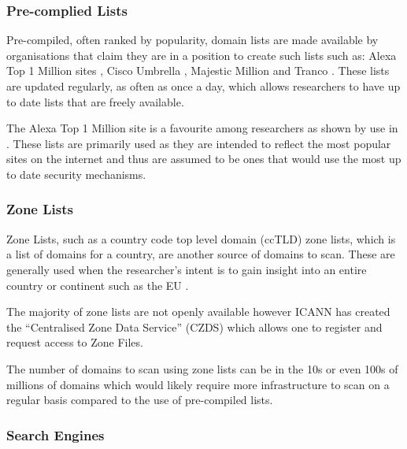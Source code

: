 \documentclass{mscreport}
\begin{document}
\subsubsection{Pre-complied Lists}

Pre-compiled, often ranked by popularity, domain lists are made available by organisations that claim they are in a position to create such lists such as: Alexa Top 1 Million sites \cite{noauthor_undated-wh}, Cisco Umbrella \cite{noauthor_undated-ku}, Majestic Million \cite{noauthor_undated-sz} and Tranco \cite{noauthor_undated-mt}. These lists are updated regularly, as often as once a day, which allows researchers to have up to date lists that are freely available.

\vspace{0.3cm} \noindent
The Alexa Top 1 Million site is a favourite among researchers as shown by use in \cite{Buchanan2018-xz,Chen2016-dl,Kumar2017-qw,Patil2017-bg,Ying2016-ag,Michael2015-hn,Van_Goethem2014-ao,Holz2020-ha,Poteat2021-zr}. These lists are primarily used as they are intended to reflect the most popular sites on the internet and thus are assumed to be ones that would use the most up to date security mechanisms.

\subsubsection{Zone Lists}

Zone Lists, such as a country code top level domain (ccTLD) zone lists, which is a list of domains for a country, are another source of domains to scan. These are generally used when the researcher's intent is to gain insight into an entire country or continent such as the EU \cite{Amann2017-co,Chen2016-dl,Van_Goethem2014-ao,Holz2020-ha}.

\vspace{0.3cm} \noindent
The majority of zone lists are not openly available however ICANN has created the ``Centralised Zone Data Service'' (CZDS) \cite{noauthor_undated-mm} which allows one to register and request access to Zone Files.

\vspace{0.3cm} \noindent
The number of domains to scan using zone lists can be in the 10s or even 100s of millions of domains which would likely require more infrastructure to scan on a regular basis compared to the use of pre-compiled lists.

\subsubsection{Search Engines}
\end{document}
